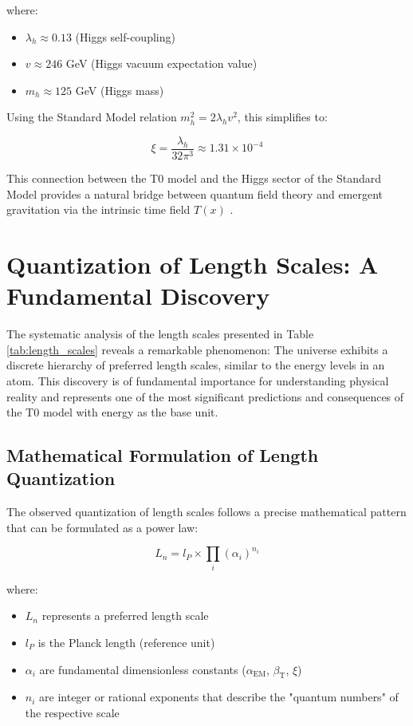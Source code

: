 \documentclass[12pt,a4paper]{article}
\newcommand{\Tfield}{T(x)}
\newcommand{\alphaEM}{\alpha_{\text{EM}}}
\newcommand{\betaT}{\beta_{\text{T}}}
\begin{document}
	where:
	\begin{itemize}
		\item $\lambda_h \approx 0.13$ (Higgs self-coupling)
		\item $v \approx 246$ GeV (Higgs vacuum expectation value)
		\item $m_h \approx 125$ GeV (Higgs mass)
	\end{itemize}
	
	Using the Standard Model relation $m_h^2 = 2\lambda_h v^2$, this simplifies to:
	
	\begin{equation}
		\xi = \frac{\lambda_h}{32\pi^3} \approx 1.31 \times 10^{-4}
	\end{equation}
	
	This connection between the T0 model and the Higgs sector of the Standard Model provides a natural bridge between quantum field theory and emergent gravitation via the intrinsic time field $\Tfield$ \cite{pascher_higgs_2025}.
\section{Quantization of Length Scales: A Fundamental Discovery}

The systematic analysis of the length scales presented in Table \ref{tab:length_scales} reveals a remarkable phenomenon: The universe exhibits a discrete hierarchy of preferred length scales, similar to the energy levels in an atom. This discovery is of fundamental importance for understanding physical reality and represents one of the most significant predictions and consequences of the T0 model with energy as the base unit.

\subsection{Mathematical Formulation of Length Quantization}

The observed quantization of length scales follows a precise mathematical pattern that can be formulated as a power law:

\begin{equation}
	L_n = l_P \times \prod_{i} (\alpha_i)^{n_i}
\end{equation}

where:
\begin{itemize}
	\item $L_n$ represents a preferred length scale
	\item $l_P$ is the Planck length (reference unit)
	\item $\alpha_i$ are fundamental dimensionless constants ($\alphaEM$, $\betaT$, $\xi$)
	\item $n_i$ are integer or rational exponents that describe the "quantum numbers" of the respective scale
\end{itemize}
\end{document}
